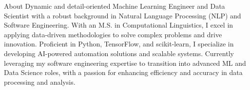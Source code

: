 \documentclass{resume} %
\begin{document}

\begin{rSection}{About}
    Dynamic and detail-oriented Machine Learning Engineer and Data Scientist with a robust background in Natural Language Processing (NLP) and Software Engineering. 
    With an M.S. in Computational Linguistics, I excel in applying data-driven methodologies to solve complex problems and drive innovation.
    Proficient in Python, TensorFlow, and scikit-learn, I specialize in developing AI-powered automation solutions and scalable systems.
    Currently leveraging my software engineering expertise to transition into advanced ML and Data Science roles, with a passion for enhancing efficiency and accuracy in data processing and analysis.
\end{rSection}
\end{document}
